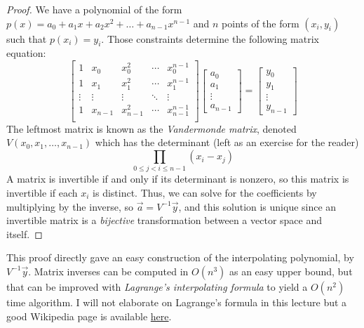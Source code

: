 \documentclass[11pt, oneside]{article}
\theoremstyle{plain}
\theoremstyle{definition}
\begin{document}
\begin{proof}
We have a polynomial of the form
\( p(x) = a_0 + a_1 x + a_2 x^2 + \dots + a_{n - 1} x^{n - 1} \) and \( n \) points
of the form \( (x_i, y_i) \) such that \( p(x_i) = y_i \). 
Those constraints determine the following matrix equation:
\[
\begin{bmatrix}
  1 & x_0 & x^2_0 & \cdots & x^{n - 1}_0 \\
  1 & x_1 & x^2_1 & \cdots & x^{n - 1}_1 \\
  \vdots & \vdots & \vdots & \ddots & \vdots \\
  1 & x_{n - 1} & x^2_{n - 1} & \cdots & x^{n - 1}_{n - 1} \\
\end{bmatrix}
\begin{bmatrix}
  a_0 \\
  a_1 \\
  \vdots \\
  a_{n - 1}
\end{bmatrix}
=
\begin{bmatrix}
  y_0 \\
  y_1 \\
  \vdots \\
  y_{n - 1}
\end{bmatrix}
\]
The leftmost matrix is known as the \textit{Vandermonde matrix},
denoted \( V(x_0, x_1, \dots, x_{n - 1}) \) which has the determinant
(left as an exercise for the reader)
\[ \prod_{0 \leq j < i \leq n - 1} (x_i - x_j) \]
A matrix is invertible if and only if its determinant is nonzero,
so this matrix is invertible if each \( x_i \) is distinct. 
Thus, we can solve for the coefficients by multiplying by the inverse, so
\( \vec{a} = V^{-1} \vec{y} \), and this solution is unique since an invertible
matrix is a \textit{bijective} transformation between a vector space and itself.
\end{proof}

This proof directly gave an easy construction of the interpolating polynomial,
by \( V^{-1} \vec{y} \). Matrix inverses can be computed in \( O(n^3) \) as
an easy upper bound, but that can be improved with
\textit{Lagrange's interpolating formula} to yield a \( O(n^2) \) time
algorithm. I will not elaborate on Lagrange's formula in this lecture
but a good Wikipedia page is available
\href{https://en.wikipedia.org/wiki/Lagrange\_polynomial}{here}.
\end{document}
